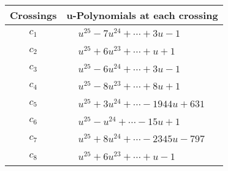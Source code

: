 \documentclass[1p]{elsarticle_modified}
\theoremstyle{definition}
\begin{document}
\begin{tabular}{m{50pt}|m{274pt}}
Crossings & \hspace{64pt}u-Polynomials at each crossing \\
\hline $$\begin{aligned}c_{1}\end{aligned}$$&$\begin{aligned}
&u^{25}-7 u^{24}+\cdots+3 u-1
\end{aligned}$\\
\hline $$\begin{aligned}c_{2}\end{aligned}$$&$\begin{aligned}
&u^{25}+6 u^{23}+\cdots+u+1
\end{aligned}$\\
\hline $$\begin{aligned}c_{3}\end{aligned}$$&$\begin{aligned}
&u^{25}-6 u^{24}+\cdots+3 u-1
\end{aligned}$\\
\hline $$\begin{aligned}c_{4}\end{aligned}$$&$\begin{aligned}
&u^{25}-8 u^{23}+\cdots+8 u+1
\end{aligned}$\\
\hline $$\begin{aligned}c_{5}\end{aligned}$$&$\begin{aligned}
&u^{25}+3 u^{24}+\cdots-1944 u+631
\end{aligned}$\\
\hline $$\begin{aligned}c_{6}\end{aligned}$$&$\begin{aligned}
&u^{25}- u^{24}+\cdots-15 u+1
\end{aligned}$\\
\hline $$\begin{aligned}c_{7}\end{aligned}$$&$\begin{aligned}
&u^{25}+8 u^{24}+\cdots-2345 u-797
\end{aligned}$\\
\hline $$\begin{aligned}c_{8}\end{aligned}$$&$\begin{aligned}
&u^{25}+6 u^{23}+\cdots+u-1
\end{aligned}$\\

\end{tabular}
\end{document}
